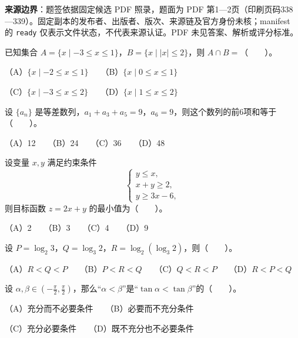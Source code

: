 

\begin{gktip}
\textbf{来源边界}：题签依据固定候选 PDF 照录，题面为 PDF 第1—2页（印刷页码338—339）。固定副本的发布者、出版者、版次、来源链及官方身份未核；manifest 的 \texttt{ready} 仅表示文件状态，不代表来源认证。PDF 未见答案、解析或评分标准。
\end{gktip}


\begin{question}
已知集合 $A=\{x\mid -3\le x\le 1\}$，$B=\{x\mid |x|\le 2\}$，则 $A\cap B=$\mbox{（　　）}。

（A）$\{x\mid -2\le x\le 1\}$　　（B）$\{x\mid 0\le x\le 1\}$

（C）$\{x\mid -3\le x\le 2\}$　　（D）$\{x\mid 1\le x\le 2\}$

\end{question}
\begin{question}
设 $\{a_n\}$ 是等差数列，$a_1+a_3+a_5=9$，$a_6=9$，则这个数列的前6项和等于\mbox{（　　）}。

（A）12　　（B）24　　（C）36　　（D）48

\end{question}
\begin{question}
设变量 $x,y$ 满足约束条件
\nopagebreak[4]
\[
\begin{cases}y\le x,\\x+y\ge 2,\\y\ge 3x-6,\end{cases}
\]
则目标函数 $z=2x+y$ 的最小值为\mbox{（　　）}。

（A）2　　（B）3　　（C）4　　（D）9

\end{question}
\begin{question}
设 $P=\log_2 3$，$Q=\log_3 2$，$R=\log_2(\log_3 2)$，则\mbox{（　　）}。

（A）$R<Q<P$　　（B）$P<R<Q$　　（C）$Q<R<P$　　（D）$R<P<Q$

\end{question}
\begin{question}
设 $\alpha,\beta\in(-\frac\pi2,\frac\pi2)$，那么“$\alpha<\beta$”是“$\tan\alpha<\tan\beta$”的\mbox{（　　）}。

（A）充分而不必要条件　　（B）必要而不充分条件

（C）充分必要条件　　（D）既不充分也不必要条件

\end{question}
